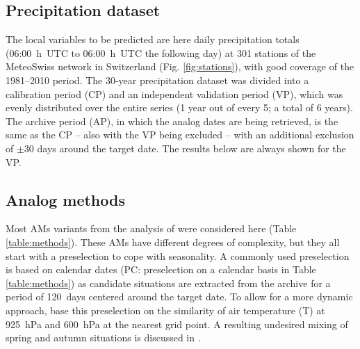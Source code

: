 \documentclass[alpha-refs]{wiley-article}
\begin{document}
\subsection{Precipitation dataset}
\label{sec:precipitation}

The local variables to be predicted are here daily precipitation totals (06:00~h~UTC to 06:00~h~UTC the following day) at 301 stations of the MeteoSwiss network in Switzerland (Fig. \ref{fig:stations}), with good coverage of the 1981--2010 period. The 30-year precipitation dataset was divided into a calibration period (CP) and an independent validation period (VP), which was evenly distributed over the entire series (1 year out of every 5; a total of 6 years). The archive period (AP), in which the analog dates are being retrieved, is the same as the CP -- also with the VP being excluded -- with an additional exclusion of $\pm30$ days around the target date. The results below are always shown for the VP.


\subsection{Analog methods}
\label{sec:ams}

Most AMs variants from the analysis of \cite{Horton2018b} were considered here (Table \ref{table:methods}). These AMs have different degrees of complexity, but they all start with a preselection to cope with seasonality. A commonly used preselection is based on calendar dates (PC: preselection on a calendar basis in Table \ref{table:methods}) as candidate situations are extracted from the archive for a period of 120~days centered around the target date. To allow for a more dynamic approach, \citet{BenDaoud2016} base this preselection on the similarity of air temperature (T) at 925~hPa and 600~hPa at the nearest grid point. A resulting undesired mixing of spring and autumn situations is discussed in \citet{Caillouet2016}. 
\end{document}

